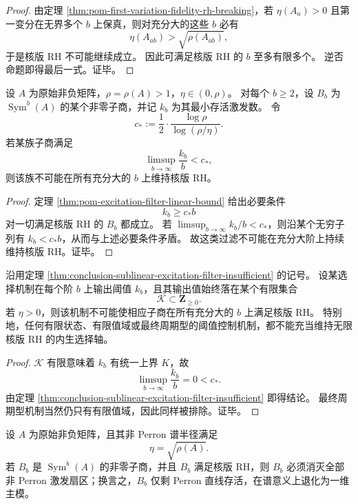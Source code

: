 \begin{proof}
由定理 \ref{thm:pom-first-variation-fidelity-rh-breaking}，若 \(\eta(A_a)>0\) 且第一变分在无界多个 \(b\) 上保真，则对充分大的这些 \(b\) 必有
\[
\eta(A_{ab})>\sqrt{\rho(A_{ab})},
\]
于是核版 RH 不可能继续成立。
因此可满足核版 RH 的 \(b\) 至多有限多个。
逆否命题即得最后一式。证毕。
\end{proof}

\begin{theorem}[任何次线性激发过滤都不足以维持高阶核版 RH]\label{thm:conclusion-sublinear-excitation-filter-insufficient}
设 \(A\) 为原始非负矩阵，\(\rho=\rho(A)>1\)，\(\eta\in(0,\rho)\)。
对每个 \(b\ge 2\)，设 \(B_b\) 为 \(\operatorname{Sym}^b(A)\) 的某个非零子商，并记 \(k_b\) 为其最小存活激发数。
令
\[
c_\ast:=\frac12\cdot\frac{\log\rho}{\log(\rho/\eta)}.
\]
若某族子商满足
\[
\limsup_{b\to\infty}\frac{k_b}{b}<c_\ast,
\]
则该族不可能在所有充分大的 \(b\) 上维持核版 RH。
\end{theorem}

\begin{proof}
定理 \ref{thm:pom-excitation-filter-linear-bound} 给出必要条件
\[
k_b\ge c_\ast b
\]
对一切满足核版 RH 的 \(B_b\) 都成立。
若 \(\limsup_{b\to\infty}k_b/b<c_\ast\)，则沿某个无穷子列有 \(k_b<c_\ast b\)，从而与上述必要条件矛盾。
故这类过滤不可能在充分大阶上持续维持核版 RH。证毕。
\end{proof}

\begin{corollary}[有限状态选择轴不可能支撑无限核版 RH]\label{cor:conclusion-finite-state-selector-cannot-sustain-kernel-rh}
沿用定理 \ref{thm:conclusion-sublinear-excitation-filter-insufficient} 的记号。
设某选择机制在每个阶 \(b\) 上输出阈值 \(k_b\)，且其输出值始终落在某个有限集合
\[
\mathcal K\subset \mathbf Z_{\ge 0}.
\]
若 \(\eta>0\)，则该机制不可能使相应子商在所有充分大的 \(b\) 上满足核版 RH。
特别地，任何有限状态、有限值域或最终周期型的阈值控制机制，都不能充当维持无限核版 RH 的内生选择轴。
\end{corollary}

\begin{proof}
\(\mathcal K\) 有限意味着 \(k_b\) 有统一上界 \(K\)，故
\[
\limsup_{b\to\infty}\frac{k_b}{b}=0<c_\ast.
\]
由定理 \ref{thm:conclusion-sublinear-excitation-filter-insufficient} 即得结论。
最终周期型机制当然仍只有有限值域，因此同样被排除。证毕。
\end{proof}

\begin{theorem}\label{thm:conclusion-rhsharp-forces-perron-pure-quotient}
设 \(A\) 为原始非负矩阵，且其非 Perron 谱半径满足
\[
\eta=\sqrt{\rho(A)}.
\]
若 \(B_b\) 是 \(\operatorname{Sym}^b(A)\) 的非零子商，并且 \(B_b\) 满足核版 RH，则 \(B_b\) 必须消灭全部非 Perron 激发扇区；换言之，\(B_b\) 仅剩 Perron 直线存活，在谱意义上退化为一维主模。
\end{theorem}

